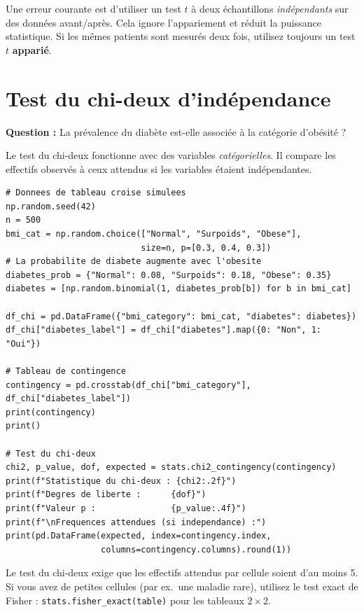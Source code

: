 \begin{warningbox}
Une erreur courante est d'utiliser un test $t$ \`a deux \'echantillons \emph{ind\'ependants} sur des donn\'ees avant/apr\`es. Cela ignore l'appariement et r\'eduit la puissance statistique. Si les m\^emes patients sont mesur\'es deux fois, utilisez toujours un test $t$ \textbf{appari\'e}.
\end{warningbox}

\section{Test du chi-deux d'ind\'ependance}

\textbf{Question :} La pr\'evalence du diab\`ete est-elle associ\'ee \`a la cat\'egorie d'ob\'esit\'e ?

Le test du chi-deux fonctionne avec des variables \emph{cat\'egorielles}. Il compare les effectifs observ\'es \`a ceux attendus si les variables \'etaient ind\'ependantes.

\begin{verbatim}
# Donnees de tableau croise simulees
np.random.seed(42)
n = 500
bmi_cat = np.random.choice(["Normal", "Surpoids", "Obese"],
                           size=n, p=[0.3, 0.4, 0.3])
# La probabilite de diabete augmente avec l'obesite
diabetes_prob = {"Normal": 0.08, "Surpoids": 0.18, "Obese": 0.35}
diabetes = [np.random.binomial(1, diabetes_prob[b]) for b in bmi_cat]

df_chi = pd.DataFrame({"bmi_category": bmi_cat, "diabetes": diabetes})
df_chi["diabetes_label"] = df_chi["diabetes"].map({0: "Non", 1: "Oui"})

# Tableau de contingence
contingency = pd.crosstab(df_chi["bmi_category"], df_chi["diabetes_label"])
print(contingency)
print()

# Test du chi-deux
chi2, p_value, dof, expected = stats.chi2_contingency(contingency)
print(f"Statistique du chi-deux : {chi2:.2f}")
print(f"Degres de liberte :      {dof}")
print(f"Valeur p :               {p_value:.4f}")
print(f"\nFrequences attendues (si independance) :")
print(pd.DataFrame(expected, index=contingency.index,
                   columns=contingency.columns).round(1))
\end{verbatim}

\begin{clinicalnote}
Le test du chi-deux exige que les effectifs attendus par cellule soient d'au moins 5. Si vous avez de petites cellules (par ex.\ une maladie rare), utilisez le test exact de Fisher : \texttt{stats.fisher\_exact(table)} pour les tableaux $2 \times 2$.
\end{clinicalnote}


